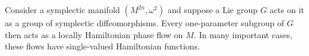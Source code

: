 Consider a symplectic manifold $(M^{2n}, \omega^2)$ and suppose a Lie group $G$ acts on it as a group of symplectic diffeomorphisms. Every one-parameter subgroup of $G$ then acts as a locally Hamiltonian phase flow on $M$. In many important cases, these flows have single-valued Hamiltonian functions.
